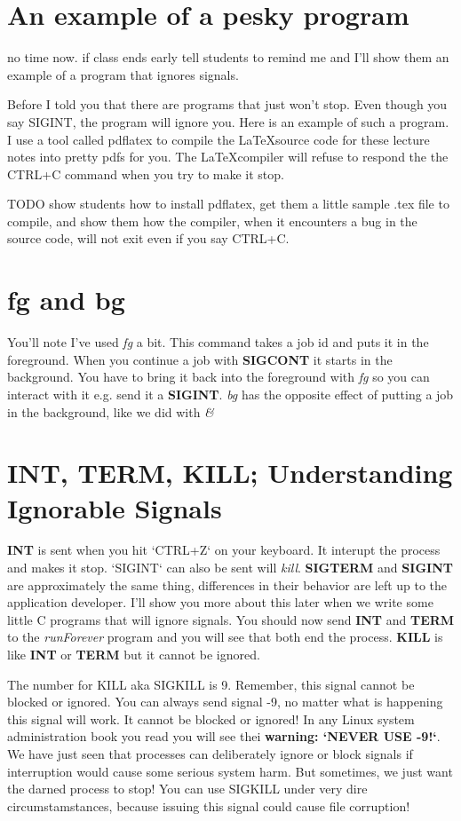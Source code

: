 \documentclass[8pt]{article}
\begin{document}
\section{An example of a pesky program}
{\Large no time now. if class ends early tell students to remind me and I'll
show them an example of a program that ignores signals.}

Before I told you that there are programs that just won't stop. Even though you
say SIGINT, the program will ignore you. Here is an example of such a program. I
use a tool called pdflatex to compile the \LaTeX source code for these lecture
notes into pretty pdfs for you. The \LaTeX compiler will refuse to respond the
the CTRL+C command when you try to make it stop.

TODO show students how to install pdflatex, get them a little sample .tex file
to compile, and show them how the compiler, when it encounters a bug in the
source code, will not exit even if you say CTRL+C.


\section{fg and bg}
You'll note I've used \textit{fg} a bit. This command takes a job id and puts it in the foreground. When you continue a job with \textbf{SIGCONT} it starts in the background. You have to bring it back into the foreground with \textit{fg} so you can interact with it e.g. send it a \textbf{SIGINT}. \textit{bg} has the opposite effect of putting a job in the background, like we did with \textit{\&}

\section{INT, TERM, KILL; Understanding Ignorable Signals}
\textbf{INT} is sent when you hit `CTRL+Z` on your keyboard. It interupt the
process and makes it stop. `SIGINT` can also be sent will \textit{kill}.
\textbf{SIGTERM} and \textbf{SIGINT} are approximately the same thing,
differences in their behavior are left up to the application developer. I'll
show you more about this later when we write some little C programs that will
ignore signals. You should now send \textbf{INT} and \textbf{TERM} to the \textit{runForever} program and you will see that both end the process. \textbf{KILL} is like \textbf{INT} or \textbf{TERM} but it cannot be ignored.

The number for KILL aka SIGKILL is 9. Remember, this signal cannot be blocked or
ignored. You can always send signal -9, no matter what is happening this signal
will work. It cannot be blocked or ignored! In any Linux system administration
book you read you will see thei \textbf{warning: `NEVER USE -9!`}. We have just
seen that processes can deliberately ignore or block signals if interruption
would cause some serious system harm. But sometimes, we just want the darned
process to stop! You can use SIGKILL under very dire circumstamstances, because
issuing this signal could cause file corruption!
\end{document}
